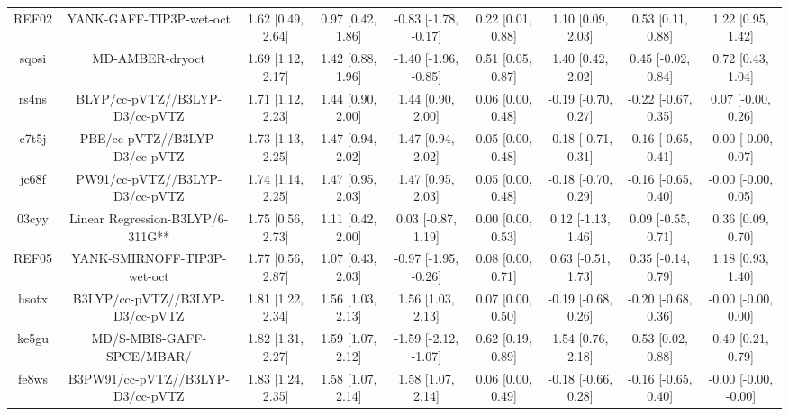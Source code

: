 \documentclass{article}
\begin{document}
\begin{center}
\begin{longtable}{|ccccccccc|}
 REF02 &                            YANK-GAFF-TIP3P-wet-oct &  1.62 [0.49, 2.64] &  0.97 [0.42, 1.86] &  -0.83 [-1.78, -0.17] &  0.22 [0.01, 0.88] &    1.10 [0.09, 2.03] &    0.53 [0.11, 0.88] &     1.22 [0.95, 1.42] \\
 sqosi &                                    MD-AMBER-dryoct &  1.69 [1.12, 2.17] &  1.42 [0.88, 1.96] &  -1.40 [-1.96, -0.85] &  0.51 [0.05, 0.87] &    1.40 [0.42, 2.02] &   0.45 [-0.02, 0.84] &     0.72 [0.43, 1.04] \\
 rs4ns &                     BLYP/cc-pVTZ//B3LYP-D3/cc-pVTZ &  1.71 [1.12, 2.23] &  1.44 [0.90, 2.00] &     1.44 [0.90, 2.00] &  0.06 [0.00, 0.48] &  -0.19 [-0.70, 0.27] &  -0.22 [-0.67, 0.35] &    0.07 [-0.00, 0.26] \\
 c7t5j &                      PBE/cc-pVTZ//B3LYP-D3/cc-pVTZ &  1.73 [1.13, 2.25] &  1.47 [0.94, 2.02] &     1.47 [0.94, 2.02] &  0.05 [0.00, 0.48] &  -0.18 [-0.71, 0.31] &  -0.16 [-0.65, 0.41] &   -0.00 [-0.00, 0.07] \\
 jc68f &                     PW91/cc-pVTZ//B3LYP-D3/cc-pVTZ &  1.74 [1.14, 2.25] &  1.47 [0.95, 2.03] &     1.47 [0.95, 2.03] &  0.05 [0.00, 0.48] &  -0.18 [-0.70, 0.29] &  -0.16 [-0.65, 0.40] &   -0.00 [-0.00, 0.05] \\
 03cyy &                   Linear Regression-B3LYP/6-311G** &  1.75 [0.56, 2.73] &  1.11 [0.42, 2.00] &    0.03 [-0.87, 1.19] &  0.00 [0.00, 0.53] &   0.12 [-1.13, 1.46] &   0.09 [-0.55, 0.71] &     0.36 [0.09, 0.70] \\
 REF05 &                        YANK-SMIRNOFF-TIP3P-wet-oct &  1.77 [0.56, 2.87] &  1.07 [0.43, 2.03] &  -0.97 [-1.95, -0.26] &  0.08 [0.00, 0.71] &   0.63 [-0.51, 1.73] &   0.35 [-0.14, 0.79] &     1.18 [0.93, 1.40] \\
 hsotx &                    B3LYP/cc-pVTZ//B3LYP-D3/cc-pVTZ &  1.81 [1.22, 2.34] &  1.56 [1.03, 2.13] &     1.56 [1.03, 2.13] &  0.07 [0.00, 0.50] &  -0.19 [-0.68, 0.26] &  -0.20 [-0.68, 0.36] &   -0.00 [-0.00, 0.00] \\
 ke5gu &                          MD/S-MBIS-GAFF-SPCE/MBAR/ &  1.82 [1.31, 2.27] &  1.59 [1.07, 2.12] &  -1.59 [-2.12, -1.07] &  0.62 [0.19, 0.89] &    1.54 [0.76, 2.18] &    0.53 [0.02, 0.88] &     0.49 [0.21, 0.79] \\
 fe8ws &                   B3PW91/cc-pVTZ//B3LYP-D3/cc-pVTZ &  1.83 [1.24, 2.35] &  1.58 [1.07, 2.14] &     1.58 [1.07, 2.14] &  0.06 [0.00, 0.49] &  -0.18 [-0.66, 0.28] &  -0.16 [-0.65, 0.40] &  -0.00 [-0.00, -0.00] \\

\end{longtable}
\end{center}
\end{document}
